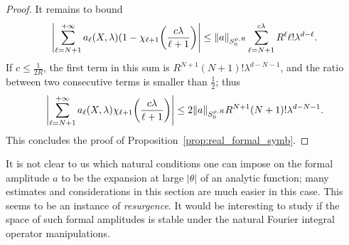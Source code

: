 \documentclass[AHL,Unicode,longabstracts,published]{cedram}
\newcommand\1{\mathds{1}}
\let\originalleft\left
\let\originalright\right
\renewcommand{\left}{\mathopen{}\mathclose\bgroup\originalleft}
\renewcommand{\right}{\aftergroup\egroup\originalright}
\begin{document}
\begin{proof}
It remains to bound
\[
\left|\sum_{\ell=N+1}^{+\infty}a_\ell(X,\lambda)(1-\chi_{\ell+1}\left(\frac{c\lambda}{\ell+1}\right)\right|\leq \|a\|_{S^{\rho,R}_0}
\sum_{\ell=N+1}^{c\lambda}R^{\ell}\ell!\lambda^{d-\ell}.
\]
If $c\leq \frac{1}{2R}$, the first term in this sum is $R^{N+1}(N+1)!\lambda^{d-N-1}$, and the ratio between two consecutive terms is smaller than $\frac{1}{2}$; thus
\[
\left|\sum_{\ell=N+1}^{+\infty}a_\ell(X,\lambda)\chi_{\ell+1}\left(\frac{c\lambda}{\ell+1}\right)\right|\leq 2\|a\|_{S^{\rho,R}_0}R^{N+1}(N+1)!\lambda^{d-N-1}.
\]
This concludes the proof of Proposition~\ref{prop:real_formal_symb}.
\end{proof}

\begin{rema}\label{rem:Resurgence}
It is not clear to us which natural conditions one can impose on the formal amplitude $a$ to be the expansion at large $|\theta|$ of an analytic function; many estimates and considerations in this section are much easier in this case. This seems to be an instance of
\emph{resurgence}. It would be interesting to study if the space of such formal amplitudes is stable under the natural Fourier integral operator manipulations.
\end{rema}
\end{document}
